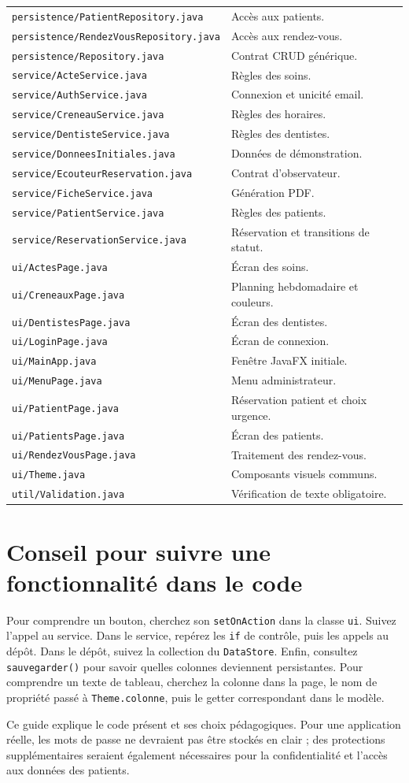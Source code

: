 \documentclass[11pt,a4paper]{report}
\begin{document}
\begin{longtable}{p{}p{}}
\texttt{persistence/PatientRepository.java} & Accès aux patients. \\
\texttt{persistence/RendezVousRepository.java} & Accès aux rendez-vous. \\
\texttt{persistence/Repository.java} & Contrat CRUD générique. \\
\texttt{service/ActeService.java} & Règles des soins. \\
\texttt{service/AuthService.java} & Connexion et unicité email. \\
\texttt{service/CreneauService.java} & Règles des horaires. \\
\texttt{service/DentisteService.java} & Règles des dentistes. \\
\texttt{service/DonneesInitiales.java} & Données de démonstration. \\
\texttt{service/EcouteurReservation.java} & Contrat d'observateur. \\
\texttt{service/FicheService.java} & Génération PDF. \\
\texttt{service/PatientService.java} & Règles des patients. \\
\texttt{service/ReservationService.java} & Réservation et transitions de statut. \\
\texttt{ui/ActesPage.java} & Écran des soins. \\
\texttt{ui/CreneauxPage.java} & Planning hebdomadaire et couleurs. \\
\texttt{ui/DentistesPage.java} & Écran des dentistes. \\
\texttt{ui/LoginPage.java} & Écran de connexion. \\
\texttt{ui/MainApp.java} & Fenêtre JavaFX initiale. \\
\texttt{ui/MenuPage.java} & Menu administrateur. \\
\texttt{ui/PatientPage.java} & Réservation patient et choix urgence. \\
\texttt{ui/PatientsPage.java} & Écran des patients. \\
\texttt{ui/RendezVousPage.java} & Traitement des rendez-vous. \\
\texttt{ui/Theme.java} & Composants visuels communs. \\
\texttt{util/Validation.java} & Vérification de texte obligatoire. \\
\end{longtable}

\chapter{Conseil pour suivre une fonctionnalité dans le code}
Pour comprendre un bouton, cherchez son \texttt{setOnAction} dans la classe \texttt{ui}. Suivez l'appel au service. Dans le service, repérez les \texttt{if} de contrôle, puis les appels au dépôt. Dans le dépôt, suivez la collection du \texttt{DataStore}. Enfin, consultez \texttt{sauvegarder()} pour savoir quelles colonnes deviennent persistantes. Pour comprendre un texte de tableau, cherchez la colonne dans la page, le nom de propriété passé à \texttt{Theme.colonne}, puis le getter correspondant dans le modèle.

Ce guide explique le code présent et ses choix pédagogiques. Pour une application réelle, les mots de passe ne devraient pas être stockés en clair ; des protections supplémentaires seraient également nécessaires pour la confidentialité et l'accès aux données des patients.
\end{document}
